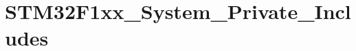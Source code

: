 \hypertarget{group__STM32F1xx__System__Private__Includes}{}\section{S\+T\+M32\+F1xx\+\_\+\+System\+\_\+\+Private\+\_\+\+Includes}
\label{group__STM32F1xx__System__Private__Includes}
